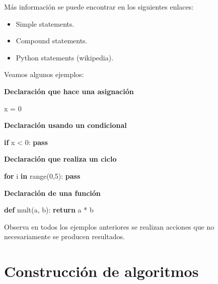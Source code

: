 \documentclass[
  spanish,
  letterpaper,
]{scrbook}
\newenvironment{Shaded}{\begin{snugshade}}{\end{snugshade}}
\newcommand{\BuiltInTok}[1]{\textcolor[rgb]{0.00,0.23,0.31}{#1}}
\newcommand{\ControlFlowTok}[1]{\textcolor[rgb]{0.00,0.23,0.31}{\textbf{#1}}}
\newcommand{\DecValTok}[1]{\textcolor[rgb]{0.68,0.00,0.00}{#1}}
\newcommand{\KeywordTok}[1]{\textcolor[rgb]{0.00,0.23,0.31}{\textbf{#1}}}
\newcommand{\NormalTok}[1]{\textcolor[rgb]{0.00,0.23,0.31}{#1}}
\newcommand{\OperatorTok}[1]{\textcolor[rgb]{0.37,0.37,0.37}{#1}}
\providecommand{\tightlist}{%
  \setlength{\itemsep}{0pt}\setlength{\parskip}{0pt}}
\theoremstyle{definition}
\theoremstyle{remark}
\begin{document}
Más información se puede encontrar en los siguientes enlaces:

\begin{itemize}
\tightlist
\item
  Simple statements.
\item
  Compound statements.
\item
  Python statements (wikipedia).
\end{itemize}

Veamos algunos ejemplos:

\textbf{Declaración que hace una asignación}

\begin{Shaded}
\begin{Highlighting}[]
\NormalTok{x }\OperatorTok{=} \DecValTok{0}
\end{Highlighting}
\end{Shaded}

\textbf{Declaración usando un condicional}

\begin{Shaded}
\begin{Highlighting}[]
\ControlFlowTok{if}\NormalTok{ x }\OperatorTok{\textless{}} \DecValTok{0}\NormalTok{:}
    \ControlFlowTok{pass}
\end{Highlighting}
\end{Shaded}

\textbf{Declaración que realiza un ciclo}

\begin{Shaded}
\begin{Highlighting}[]
\ControlFlowTok{for}\NormalTok{ i }\KeywordTok{in} \BuiltInTok{range}\NormalTok{(}\DecValTok{0}\NormalTok{,}\DecValTok{5}\NormalTok{):}
    \ControlFlowTok{pass}
\end{Highlighting}
\end{Shaded}

\textbf{Declaración de una función}

\begin{Shaded}
\begin{Highlighting}[]
\KeywordTok{def}\NormalTok{ mult(a, b):}
    \ControlFlowTok{return}\NormalTok{ a }\OperatorTok{*}\NormalTok{ b}
\end{Highlighting}
\end{Shaded}

Observa en todos los ejemplos anteriores se realizan acciones que no
necesariamente se producen resultados.

\section{Construcción de
algoritmos}\label{construcciuxf3n-de-algoritmos}
\end{document}
